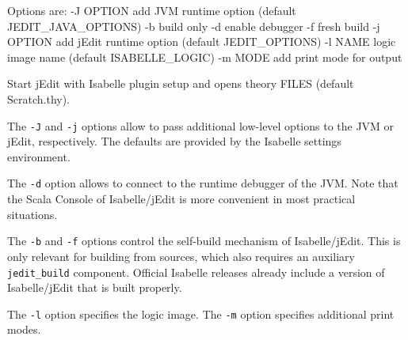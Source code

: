 \begin{isabellebody}
\begin{isamarkuptext}
\begin{ttbox}
  Options are:
    -J OPTION    add JVM runtime option (default JEDIT_JAVA_OPTIONS)
    -b           build only
    -d           enable debugger
    -f           fresh build
    -j OPTION    add jEdit runtime option (default JEDIT_OPTIONS)
    -l NAME      logic image name (default ISABELLE_LOGIC)
    -m MODE      add print mode for output

Start jEdit with Isabelle plugin setup and opens theory FILES
(default Scratch.thy).
\end{ttbox}

The \verb|-J| and \verb|-j| options allow to pass
additional low-level options to the JVM or jEdit, respectively.  The
defaults are provided by the Isabelle settings environment.

The \verb|-d| option allows to connect to the runtime debugger
of the JVM.  Note that the Scala Console of Isabelle/jEdit is more
convenient in most practical situations.

The \verb|-b| and \verb|-f| options control the
self-build mechanism of Isabelle/jEdit.  This is only relevant for
building from sources, which also requires an auxiliary \verb|jedit_build| component.  Official Isabelle releases already include a
version of Isabelle/jEdit that is built properly.

The \verb|-l| option specifies the logic image.  The
\verb|-m| option specifies additional print modes.%
\end{isamarkuptext}%
\isamarkuptrue%
%
\isadelimtheory
%
\endisadelimtheory
%
\isatagtheory
{}\isamarkupfalse%
%
\endisatagtheory
{\isafoldtheory}%
%
\isadelimtheory
%
\endisadelimtheory
\end{isabellebody}%
